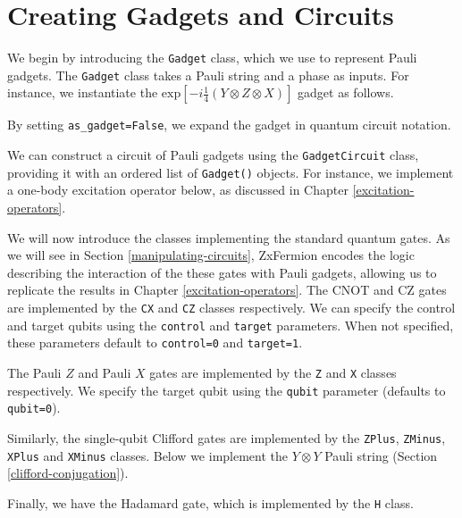 \section{Creating Gadgets and Circuits}

We begin by introducing the \lstinline{Gadget} class, which we use to represent Pauli gadgets. The \lstinline{Gadget} class takes a Pauli string and a phase as inputs. For instance, we instantiate the $\text{exp} \left[ - i\frac{1}{4} \left(Y \otimes Z \otimes X \right) \right]$ gadget as follows.


By setting \lstinline{as_gadget=False}, we expand the gadget in quantum circuit notation.


We can construct a circuit of Pauli gadgets using the \lstinline{GadgetCircuit} class, providing it with an ordered list of \lstinline{Gadget()} objects. For instance, we implement a one-body excitation operator below, as discussed in Chapter \ref{excitation-operators}.


We will now introduce the classes implementing the standard quantum gates. As we will see in Section \ref{manipulating-circuits}, ZxFermion encodes the logic describing the interaction of the these gates with Pauli gadgets, allowing us to replicate the results in Chapter \ref{excitation-operators}. The CNOT and CZ gates are implemented by the \lstinline{CX} and \lstinline{CZ} classes respectively. We can specify the control and target qubits using the \lstinline{control} and \lstinline{target} parameters. When not specified, these parameters default to \lstinline{control=0} and \lstinline{target=1}.


The Pauli $Z$ and Pauli $X$ gates are implemented by the \lstinline{Z} and \lstinline{X} classes respectively. We specify the target qubit using the \lstinline{qubit} parameter (defaults to \lstinline{qubit=0}). 


Similarly, the single-qubit Clifford gates are implemented by the \lstinline{ZPlus}, \lstinline{ZMinus}, \lstinline{XPlus} and \lstinline{XMinus} classes. Below we implement the $Y \otimes Y$ Pauli string (Section \ref{clifford-conjugation}).


Finally, we have the Hadamard gate, which is implemented by the \lstinline{H} class.

